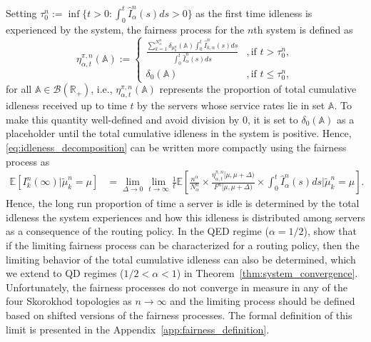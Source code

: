 \documentclass[a4paper,11pt,twoside]{article}
\numberwithin{equation}{section}
\numberwithin{figure}{section}
\theoremstyle{plain}
\newcommand{\cB}{\mathcal{B}}
\newcommand{\AAA}{\mathbb{A}}
\newcommand{\EE}{\mathbb{E}}
\newcommand{\RR}{\mathbb{R}}
\newcommand{\1}{\mathbbm{1}}
\begin{document}
Setting 
 $\tau_0^n:=\inf\{t>0:\int_0^t\hat{I}_\alpha^n(s)ds>0\}$  as the first time idleness is experienced by the system, the fairness process for the $n$th system is defined as
\begin{equation}
    \eta_{\alpha,t}^{\pi,n}(\AAA):=\left\{\begin{array}{ll}
    \displaystyle\frac{\sum_{k=1}^{N_\alpha^n}\delta_{\mu_k^n}(\AAA)\int_0^t\hat{I}_{k,\alpha}^n(s)ds}{\int_0^t\hat{I}_{\alpha}^n(s)ds} &, \mbox{if }t>\tau_0^n,
    \\
    \delta_0(\AAA) &, \mbox{if }t\leq \tau_0^n,
    \end{array}\right.
\end{equation}
for all $\AAA \in \cB(\RR_+)$, i.e., $\eta_{\alpha,t}^{\pi, n}(\AAA)$ represents the proportion of total cumulative idleness received up to time $t$  by the servers whose service rates lie in set $\AAA$. To make this quantity well-defined and avoid division by 0, it is set to $\delta_0(\AAA)$ as a placeholder until the total cumulative idleness in the system is positive. Hence, \eqref{eq:idleness_decomposition} can be written more compactly using the fairness process as 
\begin{align}
    \EE[I_k^n(\infty)|\tilde{\mu}_k^n=\mu]& =\lim_{\Delta\to 0}\lim_{t\to\infty}\frac{1}{t}\EE\left[\frac{n^\alpha}{N_\alpha^n}    \times\frac{\eta_{\alpha,t}^{\pi,n}[\mu,\mu+\Delta)}{F^n[\mu,\mu+\Delta)}
    \times
    \int_0^t \hat{I}_\alpha^{n}(s)ds|\tilde{\mu}_k^n=\mu\right]. \label{eq:idleness_decomposition_fairness}
\end{align}
Hence, the long run proportion of time a server is idle is determined by the total idleness the system experiences and how this idleness is distributed among servers as a consequence of the routing policy. In the QED regime ($\alpha = 1/2$), \cite{bukeqin2019} show that if the limiting fairness process can be characterized for a routing policy, then the limiting behavior of the total cumulative idleness can also be determined, which we extend to QD regimes ($1/2<\alpha< 1$) in Theorem~\ref{thm:system_convergence}.  Unfortunately, the fairness processes do not converge in measure in any of the four Skorokhod topologies as $n\to \infty$ and the limiting process should be defined based on shifted versions of the fairness processes. The formal definition of this limit is presented in the Appendix~\ref{app:fairness_definition}. 
\end{document}
